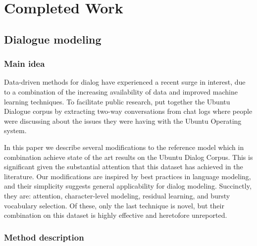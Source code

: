 \documentclass[11pt]{article}
\begin{document}
\section{Completed Work}

\subsection{Dialogue modeling}

\subsubsection{Main idea}

Data-driven methods for dialog have experienced a recent surge in
interest, due to a combination of the increasing availability of data and
improved machine learning techniques.  To facilitate public research,
\cite{DBLP:conf/sigdial/LowePSP15} put together the Ubuntu Dialogue
corpus by extracting two-way conversations from chat logs where people
were discussing about the issues they were having with the Ubuntu
Operating system.  

In this paper we describe several modifications to the reference model
which in combination achieve state of the art results on the Ubuntu
Dialog Corpus.  This is significant given the substantial attention that
this dataset has achieved in the literature.  Our modifications are
inspired by best practices in language modeling, and their simplicity
suggests general applicability for dialog modeling.  Succinctly, they
are: attention, character-level modeling, residual learning, and bursty
vocabulary selection.  Of these, only the last technique is novel, but
their combination on this dataset is highly effective and heretofore
unreported.

\subsubsection{Method description}\label{our_methods}

\end{document}
